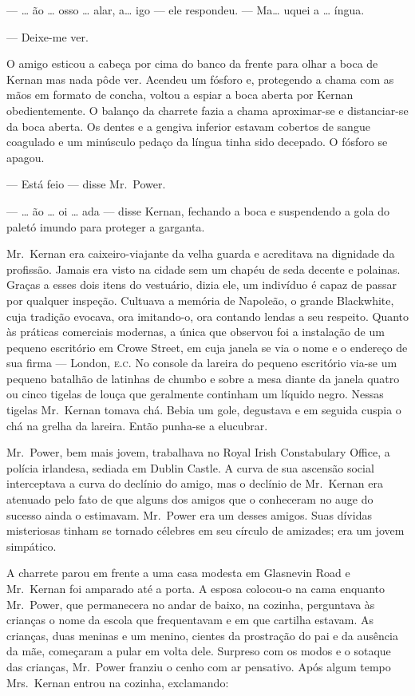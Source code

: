 --- \ldots{} ão \ldots{} osso \ldots{} alar, a\ldots{} igo --- ele respondeu.  ---
Ma\ldots{} uquei a \ldots{} íngua.

--- Deixe-me ver.

O amigo esticou a cabeça por cima do banco da frente para olhar a boca de
Kernan mas nada pôde ver.  Acendeu um fósforo e, protegendo a chama com as mãos
em formato de concha, voltou a espiar a boca aberta por Kernan obedientemente.
O balanço da charrete fazia a chama aproximar-se e distanciar-se da boca
aberta.  Os dentes e a gengiva inferior estavam cobertos de sangue coagulado e
um minúsculo pedaço da língua tinha sido decepado.  O fósforo se apagou.

--- Está feio --- disse Mr.~Power.

--- \ldots{} ão \ldots{} oi \ldots{} ada --- disse Kernan, fechando a boca e
suspendendo a gola do paletó imundo para proteger a garganta.

Mr.~Kernan era caixeiro-viajante da velha guarda e acreditava na dignidade da
profissão.  Jamais era visto na cidade sem um chapéu de seda decente e
polainas.  Graças a esses dois itens do vestuário, dizia ele, um indivíduo é
capaz de passar por qualquer inspeção.  Cultuava a memória de Napoleão, o
grande Blackwhite, cuja tradição evocava, ora imitando-o, ora contando lendas a
seu respeito.  Quanto às práticas comerciais modernas, a única que observou foi
a instalação de um pequeno escritório em Crowe Street, em cuja janela se via o
nome e o endereço de sua firma --- London, \textsc{e.c.  }No console da lareira
do pequeno escritório via-se um pequeno batalhão de latinhas de chumbo e sobre
a mesa diante da janela quatro ou cinco tigelas de louça que geralmente
continham um líquido negro.  Nessas tigelas Mr.~Kernan tomava chá.  Bebia um
gole, degustava e em seguida cuspia o chá na grelha da lareira.  Então punha-se
a elucubrar.

Mr.~Power, bem mais jovem, trabalhava no Royal Irish Constabulary Office, a
polícia irlandesa, sediada em Dublin Castle.  A curva de sua ascensão social
interceptava a curva do declínio do amigo, mas o declínio de Mr.~Kernan era
atenuado pelo fato de que alguns dos amigos que o conheceram no auge do sucesso
ainda o estimavam.  Mr.~Power era um desses amigos.  Suas dívidas misteriosas
tinham se tornado célebres em seu círculo de amizades; era um jovem simpático.

A charrete parou em frente a uma casa modesta em Glasnevin Road e Mr.~Kernan
foi amparado até a porta.  A esposa colocou-o na cama enquanto Mr.~Power, que
permanecera no andar de baixo, na cozinha, perguntava às crianças o nome da
escola que frequentavam e em que cartilha estavam.  As crianças, duas meninas e
um menino, cientes da prostração do pai e da ausência da mãe, começaram a pular
em volta dele.  Surpreso com os modos e o sotaque das crianças, Mr.~Power
franziu o cenho com ar pensativo.  Após algum tempo Mrs.~Kernan entrou na
cozinha, exclamando:

